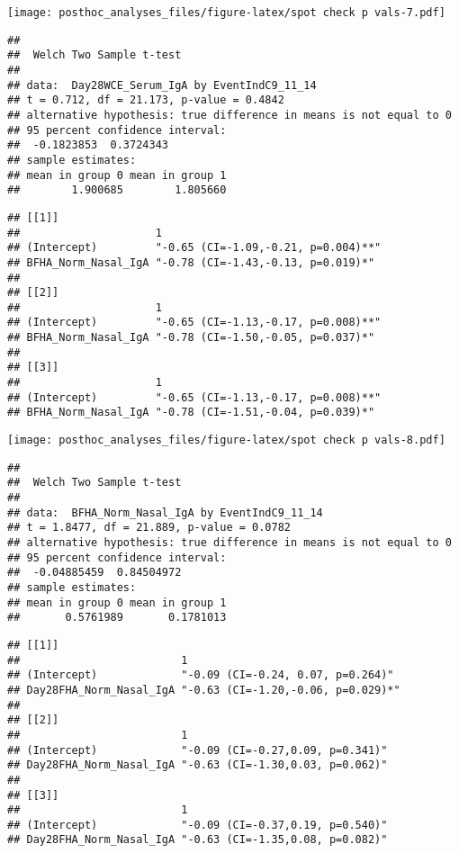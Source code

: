 \documentclass[
]{article}
\begin{document}
\texttt{[image: posthoc\_analyses\_files/figure-latex/spot check p vals-7.pdf]}

\begin{verbatim}
## 
##  Welch Two Sample t-test
## 
## data:  Day28WCE_Serum_IgA by EventIndC9_11_14
## t = 0.712, df = 21.173, p-value = 0.4842
## alternative hypothesis: true difference in means is not equal to 0
## 95 percent confidence interval:
##  -0.1823853  0.3724343
## sample estimates:
## mean in group 0 mean in group 1 
##        1.900685        1.805660
\end{verbatim}

\begin{verbatim}
## [[1]]
##                     1                                  
## (Intercept)         "-0.65 (CI=-1.09,-0.21, p=0.004)**"
## BFHA_Norm_Nasal_IgA "-0.78 (CI=-1.43,-0.13, p=0.019)*" 
## 
## [[2]]
##                     1                                  
## (Intercept)         "-0.65 (CI=-1.13,-0.17, p=0.008)**"
## BFHA_Norm_Nasal_IgA "-0.78 (CI=-1.50,-0.05, p=0.037)*" 
## 
## [[3]]
##                     1                                  
## (Intercept)         "-0.65 (CI=-1.13,-0.17, p=0.008)**"
## BFHA_Norm_Nasal_IgA "-0.78 (CI=-1.51,-0.04, p=0.039)*"
\end{verbatim}

\texttt{[image: posthoc\_analyses\_files/figure-latex/spot check p vals-8.pdf]}

\begin{verbatim}
## 
##  Welch Two Sample t-test
## 
## data:  BFHA_Norm_Nasal_IgA by EventIndC9_11_14
## t = 1.8477, df = 21.889, p-value = 0.0782
## alternative hypothesis: true difference in means is not equal to 0
## 95 percent confidence interval:
##  -0.04885459  0.84504972
## sample estimates:
## mean in group 0 mean in group 1 
##       0.5761989       0.1781013
\end{verbatim}

\begin{verbatim}
## [[1]]
##                         1                                 
## (Intercept)             "-0.09 (CI=-0.24, 0.07, p=0.264)" 
## Day28FHA_Norm_Nasal_IgA "-0.63 (CI=-1.20,-0.06, p=0.029)*"
## 
## [[2]]
##                         1                               
## (Intercept)             "-0.09 (CI=-0.27,0.09, p=0.341)"
## Day28FHA_Norm_Nasal_IgA "-0.63 (CI=-1.30,0.03, p=0.062)"
## 
## [[3]]
##                         1                               
## (Intercept)             "-0.09 (CI=-0.37,0.19, p=0.540)"
## Day28FHA_Norm_Nasal_IgA "-0.63 (CI=-1.35,0.08, p=0.082)"
\end{verbatim}
\end{document}
